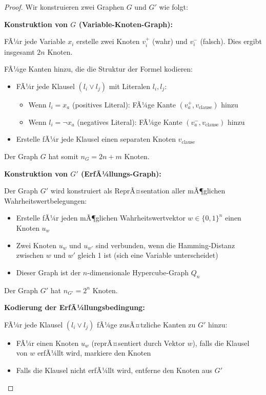 ﻿\documentclass[a4paper,12pt]{article}
\theoremstyle{definition}
\begin{document}
\begin{proof}
	Wir konstruieren zwei Graphen $G$ und $G'$ wie folgt:
	
	\textbf{Konstruktion von $G$ (Variable-Knoten-Graph):}
	
	FÃ¼r jede Variable $x_i$ erstelle zwei Knoten $v_i^+$ (wahr) und $v_i^-$ (falsch). Dies ergibt insgesamt $2n$ Knoten.
	
	FÃ¼ge Kanten hinzu, die die Struktur der Formel kodieren:
	\begin{itemize}
		\item FÃ¼r jede Klausel $(l_i \lor l_j)$ mit Literalen $l_i, l_j$:
		\begin{itemize}
			\item Wenn $l_i = x_a$ (positives Literal): FÃ¼ge Kante $(v_a^+, v_{\text{clause}})$ hinzu
			\item Wenn $l_i = \neg x_a$ (negatives Literal): FÃ¼ge Kante $(v_a^-, v_{\text{clause}})$ hinzu
		\end{itemize}
		\item Erstelle fÃ¼r jede Klausel einen separaten Knoten $v_{\text{clause}}$
	\end{itemize}
	
	Der Graph $G$ hat somit $n_G = 2n + m$ Knoten.
	
	\textbf{Konstruktion von $G'$ (ErfÃ¼llungs-Graph):}
	
	Der Graph $G'$ wird konstruiert als ReprÃ¤sentation aller mÃ¶glichen Wahrheitswertbelegungen:
	\begin{itemize}
		\item Erstelle fÃ¼r jeden mÃ¶glichen Wahrheitswertvektor $w \in \{0,1\}^n$ einen Knoten $u_w$
		\item Zwei Knoten $u_w$ und $u_{w'}$ sind verbunden, wenn die Hamming-Distanz zwischen $w$ und $w'$ gleich 1 ist (sich eine Variable unterscheidet)
		\item Dieser Graph ist der $n$-dimensionale Hypercube-Graph $Q_n$
	\end{itemize}
	
	Der Graph $G'$ hat $n_{G'} = 2^n$ Knoten.
	
	\textbf{Kodierung der ErfÃ¼llungsbedingung:}
	
	FÃ¼r jede Klausel $(l_i \lor l_j)$ fÃ¼ge zusÃ¤tzliche Kanten zu $G'$ hinzu:
	\begin{itemize}
		\item FÃ¼r einen Knoten $u_w$ (reprÃ¤sentiert durch Vektor $w$), falls die Klausel von $w$ erfÃ¼llt wird, markiere den Knoten
		\item Falls die Klausel nicht erfÃ¼llt wird, entferne den Knoten aus $G'$
	\end{itemize}
	

\end{proof}
\end{document}
